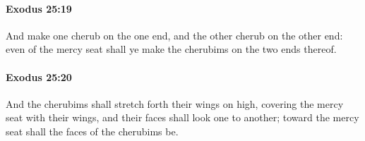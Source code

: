 		\paragraph{Exodus 25:19} %
			\label{EXODUS-25-19}

			And make one cherub on the one end, and the other cherub on the other end: even of the mercy seat shall ye make the cherubims on the two ends thereof.


		\paragraph{Exodus 25:20} %
			\label{EXODUS-25-20}

			And the cherubims shall stretch forth their wings on high, covering the mercy seat with their wings, and their faces shall look one to another; toward the mercy seat shall the faces of the cherubims be.


